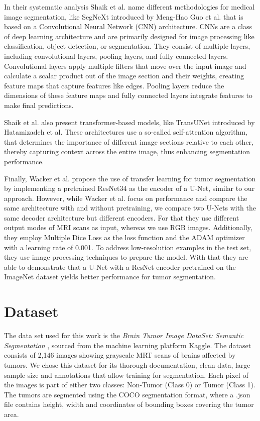 \documentclass[lettersize,journal]{IEEEtran}
\begin{document}
In their systematic analysis Shaik et al. \cite{10073734} name different methodologies for medical image segmentation, like SegNeXt \cite{guo2022segnextrethinkingconvolutionalattention} introduced by Meng-Hao Guo et al. that is based on a Convolutional Neural Network (CNN) architecture. CNNs are a class of deep learning architecture and are primarily designed for image processing like classification, object detection, or segmentation. They consist of multiple layers, including convolutional layers, pooling layers, and fully connected layers. Convolutional layers apply multiple filters that move over the input image and calculate a scalar product out of the image section and their weights, creating feature maps that capture features like edges. Pooling layers reduce the dimensions of these feature maps and fully connected layers integrate features to make final predictions. \cite{oshea2015introductionconvolutionalneuralnetworks}

Shaik et al. also present transformer-based models, like TransUNet introduced by Hatamizadeh et al. These architectures use a so-called self-attention algorithm, that determines the importance of different image sections relative to each other, thereby capturing context across the entire image, thus enhancing segmentation performance. \cite{hatamizadeh2021unetrtransformers3dmedical}

Finally, Wacker et al. propose the use of transfer learning for tumor segmentation by implementing a pretrained ResNet34 as the encoder of a U-Net, similar to our approach. However, while Wacker et al. focus on performance and compare the same architecture with and without pretraining, we compare two U-Nets with the same decoder architecture but different encoders. For that they use different output modes of MRI scans as input, whereas we use RGB images. Additionally, they employ Multiple Dice Loss as the loss function and the ADAM optimizer with a learning rate of 0.001. To address low-resolution examples in the test set, they use image processing techniques to prepare the model. With that they are able to demonstrate that a U-Net with a ResNet encoder pretrained on the ImageNet dataset yields better performance for tumor segmentation.
\cite{wacker2020transferlearningbraintumor}


\section[Methods]{Dataset}
The data set used for this work is the \textit{Brain Tumor Image DataSet: Semantic Segmentation} \cite{darabi2024BrainTumorImageDataSet}, sourced from the machine learning platform Kaggle. The dataset consists of 2,146 images showing grayscale MRT scans of brains affected by tumors. We chose this dataset for its thorough documentation, clean data, large sample size and annotations that allow training for segmentation. Each pixel of the images is part of either two classes: Non-Tumor (Class 0) or Tumor (Class 1). The tumors are segmented using the COCO segmentation format, where a .json file contains height, width and coordinates of bounding boxes covering the tumor area. 
\end{document}
